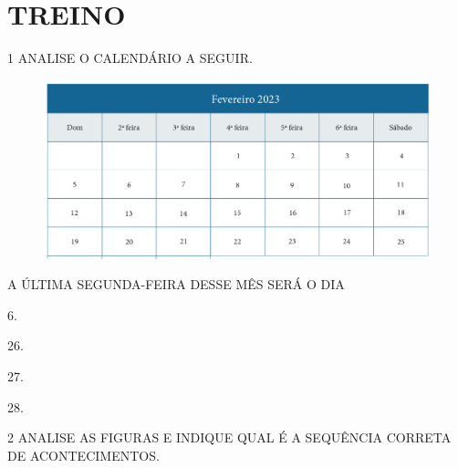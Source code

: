 \pagebreak
\section{TREINO}

\num{1} ANALISE O CALENDÁRIO A SEGUIR.

\begin{figure}[htpb!]
\centering
\includegraphics[width=\textwidth]{./media/SAEB_1ANO_MAT_FIGURA61.png}
\end{figure}

A ÚLTIMA SEGUNDA-FEIRA DESSE MÊS SERÁ O DIA

\begin{escolha}
\item 6.

\item 26.

\item 27.

\item 28.
\end{escolha}

\pagebreak

\num{2} ANALISE AS FIGURAS E INDIQUE QUAL É A SEQUÊNCIA CORRETA DE
ACONTECIMENTOS.




